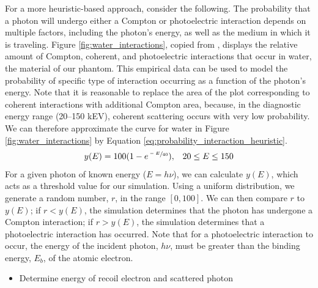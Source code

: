 \documentclass[12pt]{article} %
\begin{document}
For a more heuristic-based approach, consider the following. The probability that a photon will undergo either a Compton or photoelectric interaction depends on multiple factors, including the photon's energy, as well as the medium in which it is traveling. Figure \ref{fig:water_interactions}, copied from \cite[p.~69]{curry1990}, displays the relative amount of Compton, coherent, and photoelectric interactions that occur in water, the material of our phantom. This empirical data can be used to model the probability of specific type of interaction occurring as a function of the photon's energy. Note that it is reasonable to replace the area of the plot corresponding to coherent interactions with additional Compton area, because, in the diagnostic energy range (20--150 kEV), coherent scattering occurs with very low probability. We can therefore approximate the curve for water in Figure \ref{fig:water_interactions} by Equation \ref{eq:probability_interaction_heuristic}.
\begin{equation}
\begin{array}{rl}y(E) = 100(1-e^{\sfrac{-E}{40}}), & 20 \le E \le 150\end{array}
\label{eq:probability_interaction_heuristic}
\end{equation}
For a given photon of known energy ($E = h\nu$), we can calculate $y(E)$, which acts as a threshold value for our simulation. Using a uniform distribution, we generate a random number, $r$, in the range $[0, 100]$. We can then compare $r$ to $y(E)$; if $r < y(E)$, the simulation determines that the photon has undergone a Compton interaction; if $r > y(E)$, the simulation determines that a photoelectric interaction has occurred. Note that for a photoelectric interaction to occur, the energy of the incident photon, $h\nu$, must be greater than the binding energy, $E_{b}$, of the atomic electron.

\pagebreak[4]
\begin{itemize}
\item Determine energy of recoil electron and scattered photon
\end{itemize}
\end{document}

